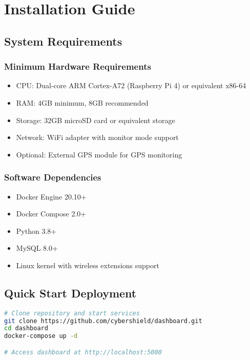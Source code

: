 \documentclass[12pt,a4paper]{report}
\begin{document}
\appendix

\chapter{Installation Guide}

\section{System Requirements}

\subsection{Minimum Hardware Requirements}
\begin{itemize}
    \item CPU: Dual-core ARM Cortex-A72 (Raspberry Pi 4) or equivalent x86-64
    \item RAM: 4GB minimum, 8GB recommended
    \item Storage: 32GB microSD card or equivalent storage
    \item Network: WiFi adapter with monitor mode support
    \item Optional: External GPS module for GPS monitoring
\end{itemize}

\subsection{Software Dependencies}
\begin{itemize}
    \item Docker Engine 20.10+
    \item Docker Compose 2.0+
    \item Python 3.8+
    \item MySQL 8.0+
    \item Linux kernel with wireless extensions support
\end{itemize}

\section{Quick Start Deployment}

\begin{lstlisting}[language=bash,caption={One-Command Deployment}]
# Clone repository and start services
git clone https://github.com/cybershield/dashboard.git
cd dashboard
docker-compose up -d

# Access dashboard at http://localhost:5000
\end{lstlisting}
\end{document}
